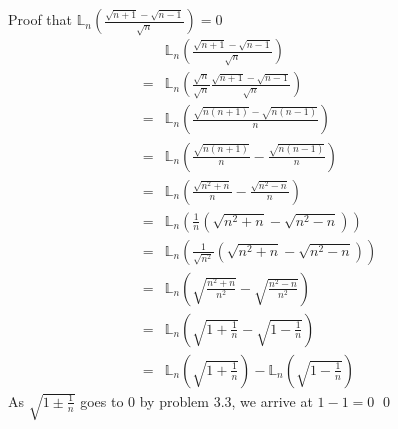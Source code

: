 \subsection{}
    Proof that $ 𝕃_{n}\left(\frac{\sqrt{n+1}-\sqrt{n-1}}{\sqrt{n}}\right)=0 $
    \begin{align*}
        &𝕃_{n}\left(\frac{\sqrt{n+1}-\sqrt{n-1}}{\sqrt{n}}\right) \\
        =&𝕃_{n}\left(\frac{\sqrt{n}}{\sqrt{n}}\frac{\sqrt{n+1}-\sqrt{n-1}}{\sqrt{n}}\right) \\
        =&𝕃_{n}\left(\frac{\sqrt{n\left(n+1\right)}-\sqrt{n\left(n-1\right)}}{n}\right) \\
        =&𝕃_{n}\left(\frac{\sqrt{n\left(n+1\right)}}{n}-\frac{\sqrt{n\left(n-1\right)}}{n}\right) \\
        =&𝕃_{n}\left(\frac{\sqrt{n^{2}+n}}{n}-\frac{\sqrt{n^{2}-n}}{n}\right) \\
        =&𝕃_{n}\left(\frac{1}{n}\left(\sqrt{n^{2}+n}-\sqrt{n^{2}-n}\right)\right) \\
        =&𝕃_{n}\left(\frac{1}{\sqrt{n^{2}}}\left(\sqrt{n^{2}+n}-\sqrt{n^{2}-n}\right)\right) \\
        =&𝕃_{n}\left(\sqrt{\frac{n^{2}+n}{n^{2}}}-\sqrt{\frac{n^{2}-n}{n^{2}}}\right) \\
        =&𝕃_{n}\left(\sqrt{1+\frac{1}{n}}-\sqrt{1-\frac{1}{n}}\right) \\
        =&𝕃_{n}\left(\sqrt{1+\frac{1}{n}}\right)-𝕃_{n}\left(\sqrt{1-\frac{1}{n}}\right)
    \end{align*}
    As $\sqrt{1±\frac{1}{n}}$ goes to $0$ by problem 3.3, we arrive at $1-1=0$ \qed